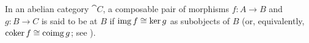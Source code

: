 \begin{definition}\label{def:exact_morphism_pair}
  In an abelian category \( \cat{C} \), a composable pair of morphisms \( f: A \to B \) and \( g: B \to C \) is said to be  at \( B \) if \( \operatorname{img} f \cong \ker g \) as subobjects of \( B \) (or, equivalently, \( \operatorname*{co\!\ker} f \cong \operatorname*{co\!\operatorname{img}} g \); see ).
\end{definition}
